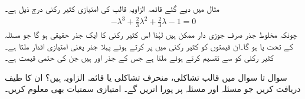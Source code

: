 مثال  میں دیے گئے قائمہ الزاویہ قالب کی امتیازی کثیر رکنی درج ذیل ہے۔
\begin{align*}
-\lambda^3+\frac{2}{3}\lambda^2+\frac{2}{3}\lambda-1=0
\end{align*} 
چونکہ مخلوط جذر صرف جوڑی دار ممکن ہیں لہٰذا اس کثیر رکنی کا ایک جذر حقیقی ہو گا جو مسئلہ  کے تحت  یا  ہو گا۔ان قیمتوں کو کثیر رکنی میں پر کرتے ہوئے پہلا جذر یعنی امتیازی اقدار  ملتا ہے۔کثیر رکنی کو  سے تقسیم کرتے ہوئے  ملتا ہے جس کے جذر   اور  ہیں جن کی حتمی قیمت  ہے۔

سوال  تا سوال  میں قالب تشاکلی، منحرف تشاکلی یا قائمہ الزاویہ ہیں؟ ان کا طیف  دریافت کریں جو مسئلہ  اور مسئلہ  پر پورا اتریں گے۔ امتیازی سمتیات بھی معلوم کریں۔

